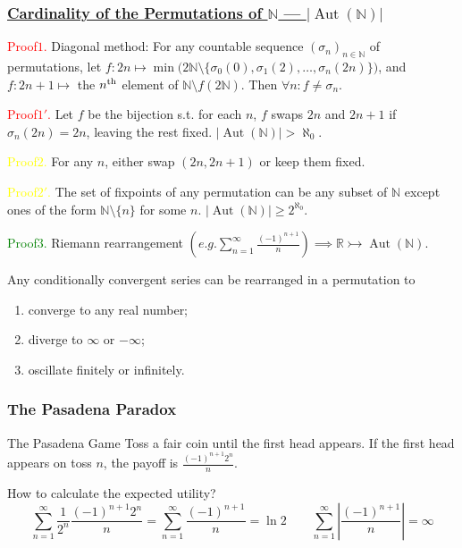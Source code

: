 \documentclass[UTF8,aspectratio=43,11pt,colorlinks,compress,openany]{beamer}%
\begin{document}
\begin{frame}\frametitle{\href{https://mathoverflow.net/questions/29475/an-easy-proof-of-the-uncountability-of-bijections-on-natural-numbers}{Cardinality of the Permutations of $\mathbb{N}$ --- $|\operatorname{Aut}(\mathbb{N})|$}}
	\textcolor{red}{Proof$1$.} Diagonal method: For any countable sequence $(\sigma_n)_{n\in\mathbb{N}}$ of permutations, let $f: 2n\mapsto \min\big(2\mathbb{N}\setminus\{\sigma_0(0),\sigma_1(2),\dots,\sigma_n(2n)\}\big)$, and $f: 2n+1\mapsto$ the $n\textsuperscript{th}$ element of $\mathbb{N}\setminus f(2\mathbb{N})$. Then $\forall n: f\ne\sigma_n$.
	
	\textcolor{red}{Proof$1'$.} Let $f$ be the bijection s.t. for each $n$, $f$ swaps $2n$ and $2n+1$ if $\sigma_n(2n)=2n$, leaving the rest fixed. $|\operatorname{Aut}(\mathbb{N})|>\aleph_0$.
	
	\textcolor{yellow}{Proof$2$.} For any $n$, either swap $(2n,2n+1)$ or keep them fixed.
	
	\textcolor{yellow}{Proof$2'$.} The set of fixpoints of any permutation can be any subset of $\mathbb{N}$ except ones of the form $\mathbb{N}\setminus\{n\}$ for some $n$. $|\operatorname{Aut}(\mathbb{N})|\geq 2^{\aleph_0}$.
	
	\textcolor{green}{Proof$3$.} Riemann rearrangement $\left(e.g. \sum\limits_{n=1}^\infty\frac{(-1)^{n+1}}{n}\right)\implies\mathbb{R}\rightarrowtail\operatorname{Aut}(\mathbb{N})$.

	\begin{theorem}
		Any conditionally convergent series can be rearranged in a permutation to
		\begin{enumerate}
			\item converge to any real number;
			\item diverge to $\infty$ or $-\infty$;
			\item oscillate finitely or infinitely.
		\end{enumerate}
	\end{theorem}
\vspace*{-12ex}
\end{frame}

\begin{frame}\frametitle{The Pasadena Paradox}
\begin{block}{The Pasadena Game}
Toss a fair coin until the first head appears. If the first head appears on toss $n$, the payoff is $\frac{(-1)^{n+1}2^n}{n}$.
\end{block}
How to calculate the expected utility?
\[\sum\limits_{n=1}^\infty\frac{1}{2^n}\frac{(-1)^{n+1}2^n}{n}=\sum\limits_{n=1}^\infty\frac{(-1)^{n+1}}{n}=\ln 2\qquad \sum\limits_{n=1}^\infty\left|\frac{(-1)^{n+1}}{n}\right|=\infty\]
\end{frame}
\end{document}
